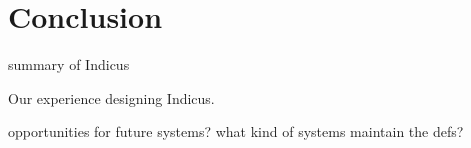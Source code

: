 \section{Conclusion}

summary of Indicus

Our experience designing Indicus.

opportunities for future systems? what kind of systems maintain the defs?
